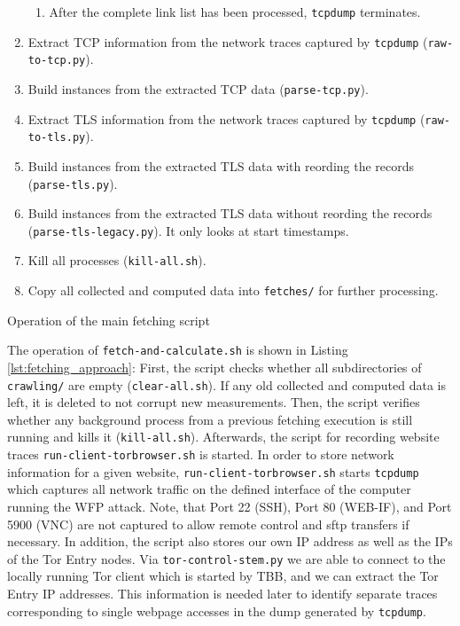 \begin{listing}
\begin{enumerate}
\begin{enumerate}
	\item After the complete link list has been processed, \texttt{tcpdump} terminates.
    \end{enumerate}
    \item Extract \ac{TCP} information from the network traces captured by \texttt{tcpdump} (\texttt{raw-to-tcp.py}). 
    \item Build instances from the extracted \ac{TCP} data (\texttt{parse-tcp.py}).
    \item Extract \ac{TLS} information from the network traces captured by \texttt{tcpdump} (\texttt{raw-to-tls.py}). 
    \item Build instances from the extracted \ac{TLS} data with reording the records (\texttt{parse-tls.py}).
    \item Build instances from the extracted \ac{TLS} data without reording the records (\texttt{parse-tls-legacy.py}). It only looks at start timestamps.
    \item Kill all processes (\texttt{kill-all.sh}).
    \item Copy all collected and computed data into \texttt{fetches/} for further processing.
\end{enumerate}
\caption{Operation of the main fetching script}
\label{lst:fetching_approach}
\end{listing}

The operation of \texttt{fetch-and-calculate.sh} is shown in Listing \ref{lst:fetching_approach}: First, the script checks whether all subdirectories of \texttt{crawling/} are empty (\texttt{clear-all.sh}). If any old collected and computed data is left, it is deleted to not corrupt new measurements. Then, the script verifies whether any background process from a previous fetching execution is still running and kills it (\texttt{kill-all.sh}). Afterwards, the script for recording website traces \texttt{run-client-torbrowser.sh} is started. In order to store network information for a given website, \texttt{run-client-torbrowser.sh} starts \texttt{tcpdump} which captures all network traffic on the defined interface of the computer running the \ac{WFP} attack. Note, that Port 22 (SSH), Port 80 (WEB-IF), and Port 5900 (VNC) are not captured to allow remote control and sftp transfers if necessary. 
In addition, the script also stores our own \ac{IP} address as well as the \ac{IP}s of the Tor Entry nodes. Via \texttt{tor-control-stem.py} we are able to connect to the locally running Tor client which is started by \ac{TBB}, and we can extract the Tor Entry \ac{IP} addresses. This information is needed later to identify separate traces corresponding to single webpage accesses in the dump generated by \texttt{tcpdump}.

